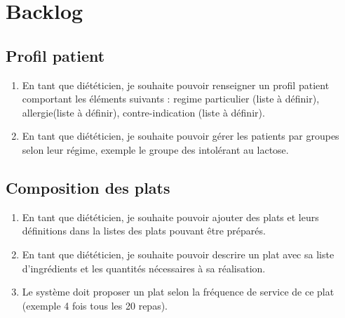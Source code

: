 \section{Backlog}
\subsection{Profil patient}
\begin{enumerate}
\item En tant que diététicien, je souhaite pouvoir renseigner un profil patient comportant les éléments suivants : regime particulier (liste à définir), allergie(liste à définir), contre-indication (liste à définir).
\item En tant que diététicien, je souhaite pouvoir gérer les patients par groupes selon leur régime, exemple le groupe des intolérant au lactose.
\end{enumerate}

\subsection{Composition des plats}
\begin{enumerate}
\item En tant que diététicien, je souhaite pouvoir ajouter des plats et leurs définitions dans la listes des plats pouvant être préparés.
\item En tant que diététicien, je souhaite pouvoir descrire un plat avec sa liste d'ingrédients et les quantités nécessaires à sa réalisation.
\item Le système doit proposer un plat selon la fréquence de service de ce plat (exemple 4 fois tous les 20 repas).
  \end{enumerate}
